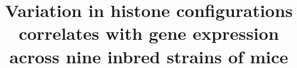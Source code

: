 \documentclass{bmcart}
\begin{document}
\begin{frontmatter}

\begin{fmbox}


\title{Variation in histone configurations correlates with gene expression across nine inbred strains of mice}



\end{fmbox}
\end{frontmatter}
\end{document}
